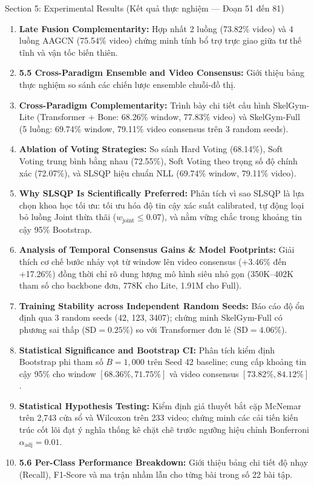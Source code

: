 \documentclass[10pt,a4paper]{article}
\begin{document}
\begin{secbox}{Section 5: Experimental Results (Kết quả thực nghiệm — Đoạn 51 đến 81)}
\begin{enumerate}[leftmargin=*, itemsep=2pt, topsep=1pt, start=51]
    \item \textbf{Late Fusion Complementarity:} Hợp nhất 2 luồng (73.82\% video) và 4 luồng AAGCN (75.54\% video) chứng minh tính bổ trợ trực giao giữa tư thế tĩnh và vận tốc biến thiên.
    \item \textbf{5.5 Cross-Paradigm Ensemble and Video Consensus:} Giới thiệu bảng thực nghiệm so sánh các chiến lược ensemble chuỗi-đồ thị.
    \item \textbf{Cross-Paradigm Complementarity:} Trình bày chi tiết cấu hình SkelGym-Lite (Transformer + Bone: 68.26\% window, 77.83\% video) và SkelGym-Full (5 luồng: 69.74\% window, 79.11\% video consensus trên 3 random seeds).
    \item \textbf{Ablation of Voting Strategies:} So sánh Hard Voting (68.14\%), Soft Voting trung bình bằng nhau (72.55\%), Soft Voting theo trọng số độ chính xác (72.07\%), và SLSQP hiệu chuẩn NLL (69.74\% window, 79.11\% video).
    \item \textbf{Why SLSQP Is Scientifically Preferred:} Phân tích vì sao SLSQP là lựa chọn khoa học tối ưu: tối ưu hóa độ tin cậy xác suất calibrated, tự động loại bỏ luồng Joint thừa thãi ($w_{\text{joint}} \le 0.07$), và nằm vững chắc trong khoảng tin cậy 95\% Bootstrap.
    \item \textbf{Analysis of Temporal Consensus Gains \& Model Footprints:} Giải thích cơ chế bước nhảy vọt từ window lên video consensus (+3.46\% đến +17.26\%) đồng thời chỉ rõ dung lượng mô hình siêu nhỏ gọn (350K--402K tham số cho backbone đơn, 778K cho Lite, 1.91M cho Full).
    \item \textbf{Training Stability across Independent Random Seeds:} Báo cáo độ ổn định qua 3 random seeds (42, 123, 3407); chứng minh SkelGym-Full có phương sai thấp ($\text{SD}=0.25\%$) so với Transformer đơn lẻ ($\text{SD}=4.06\%$).
    \item \textbf{Statistical Significance and Bootstrap CI:} Phân tích kiểm định Bootstrap phi tham số $B=1,000$ trên Seed 42 baseline; cung cấp khoảng tin cậy 95\% cho window $[68.36\%, 71.75\%]$ và video consensus $[73.82\%, 84.12\%]$.
    \item \textbf{Statistical Hypothesis Testing:} Kiểm định giả thuyết bắt cặp McNemar trên 2,743 cửa sổ và Wilcoxon trên 233 video; chứng minh các cải tiến kiến trúc cốt lõi đạt ý nghĩa thống kê chặt chẽ trước ngưỡng hiệu chỉnh Bonferroni $\alpha_{\text{adj}}=0.01$.
    \item \textbf{5.6 Per-Class Performance Breakdown:} Giới thiệu bảng chi tiết độ nhạy (Recall), F1-Score và ma trận nhầm lẫn cho từng bài trong số 22 bài tập.

\end{enumerate}
\end{secbox}
\end{document}
